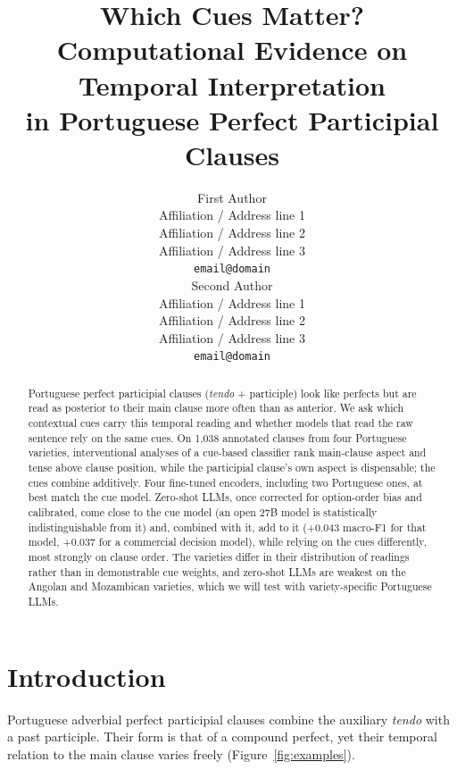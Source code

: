 \documentclass[11pt]{article}
\title{Which Cues Matter? Computational Evidence on Temporal Interpretation\\ in Portuguese Perfect Participial Clauses}
\author{First Author \\
  Affiliation / Address line 1 \\
  Affiliation / Address line 2 \\
  Affiliation / Address line 3 \\
  \texttt{email@domain} \\\And
  Second Author \\
  Affiliation / Address line 1 \\
  Affiliation / Address line 2 \\
  Affiliation / Address line 3 \\
  \texttt{email@domain} \\}
\begin{document}
\maketitle
\begin{abstract}
Portuguese perfect participial clauses (\textit{tendo} + participle) look like perfects but are read as posterior to their main clause more often than as anterior. We ask which contextual cues carry this temporal reading and whether models that read the raw sentence rely on the same cues. On 1,038 annotated clauses from four Portuguese varieties, interventional analyses of a cue-based classifier rank main-clause aspect and tense above clause position, while the participial clause's own aspect is dispensable; the cues combine additively. Four fine-tuned encoders, including two Portuguese ones, at best match the cue model. Zero-shot LLMs, once corrected for option-order bias and calibrated, come close to the cue model (an open 27B model is statistically indistinguishable from it) and, combined with it, add to it (+0.043 macro-F1 for that model, +0.037 for a commercial decision model), while relying on the cues differently, most strongly on clause order. The varieties differ in their distribution of readings rather than in demonstrable cue weights, and zero-shot LLMs are weakest on the Angolan and Mozambican varieties, which we will test with variety-specific Portuguese LLMs.
\end{abstract}

\section{Introduction}
\label{sec:intro}

Portuguese adverbial perfect participial clauses combine the auxiliary \textit{tendo} with a past participle. Their form is that of a compound perfect, yet their temporal relation to the main clause varies freely (Figure~\ref{fig:examples}).
\end{document}
